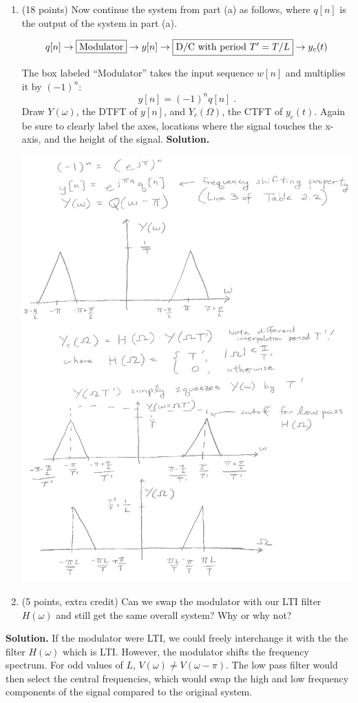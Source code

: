 \documentclass[]{siamltex}
\begin{document}
\begin{enumerate}
\begin{enumerate}
\newpage
\item (18 points) Now continue the system from part (a) as follows, where $q[n]$ is the output of the system in part (a).

$$q[n] \rightarrow \fbox{Modulator} \rightarrow y[n] \rightarrow  \fbox{D/C with period $T' = T/L$} \rightarrow y_c(t)$$


The box labeled ``Modulator'' takes the input sequence $w[n]$ and multiplies it by $(-1)^n$: $$y[n] = (-1)^n q[n]\;.$$ Draw $Y(\omega)$, the DTFT of $y[n]$, and $Y_c(\Omega)$, the CTFT of $y_c(t)$. Again be sure to clearly label the axes, locations where the signal touches the x-axis, and the height of the signal.
\textbf{Solution.}

\includegraphics[height = 0.6\textheight]{5b.png} 

\item (5 points, extra credit) Can we swap the modulator with our LTI filter $H(\omega)$ and still get the same overall system? Why or why not?
\end{enumerate}

\textbf{Solution.} If the modulator were LTI, we could freely interchange it with the the filter $H(\omega)$ which is LTI. However, the modulator shifts the frequency spectrum. For odd values of $L$, $V(\omega) \neq V(\omega - \pi)$. The low pass filter would then select the central frequencies, which would swap the high and low frequency components of the signal compared to the original system.






\end{enumerate}
\end{document}
